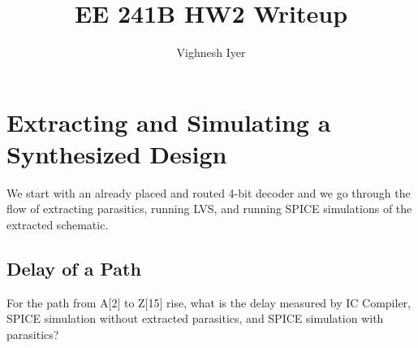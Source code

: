 \documentclass[11pt]{article}
\begin{document}
\title{EE 241B HW2 Writeup}

\author{Vighnesh Iyer}
\date{}
\maketitle

\tableofcontents

\section{Extracting and Simulating a Synthesized Design}
We start with an already placed and routed 4-bit decoder and we go through the flow of extracting parasitics, running LVS, and running SPICE simulations of the extracted schematic.

\subsection{Delay of a Path}
For the path from A[2] to Z[15] rise, what is the delay measured by IC Compiler, SPICE simulation without extracted parasitics, and SPICE simulation with parasitics?
\end{document}
